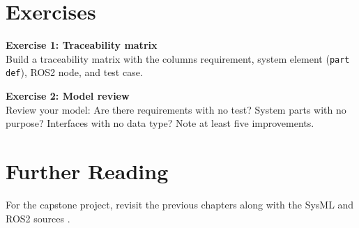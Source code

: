 \section{Exercises}
\begin{uebungbox}
\textbf{Exercise 1: Traceability matrix}\\
Build a traceability matrix with the columns requirement, system element (\texttt{part def}), ROS2 node, and test case.
\end{uebungbox}

\begin{uebungbox}
\textbf{Exercise 2: Model review}\\
Review your model: Are there requirements with no test? System parts with no purpose? Interfaces with no data type? Note at least five improvements.
\end{uebungbox}

\section{Further Reading}
For the capstone project, revisit the previous chapters along with the SysML and ROS2 sources \cite{delligatti2014,friedenthal2014,ros2docs}.
